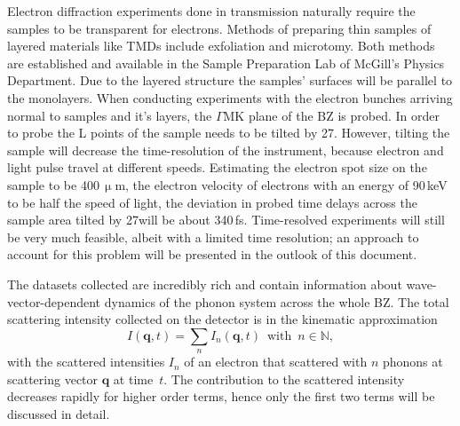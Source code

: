 Electron diffraction experiments done in transmission naturally require the samples to be transparent for electrons.
Methods of preparing thin samples of layered materials like \acp{TMD} include exfoliation\cite{exf} and microtomy\cite{micro}.
Both methods are established and available in the Sample Preparation Lab of McGill's Physics Department.
Due to the layered structure the samples' surfaces will be parallel to the monolayers.
When conducting experiments with the electron bunches arriving normal to \ts\space samples and it's layers, the $\Gamma\mathrm{MK}$ plane of the \ac{BZ} is probed.
In order to probe the L points of \ts\space the sample needs to be tilted by 27\textdegree.
However, tilting the sample will decrease the time-resolution of the instrument, because electron and light pulse travel at different speeds.
Estimating the electron spot size on the sample to be 400\,$\upmu$m, the electron velocity of electrons with an energy of 90\,keV to be half the speed of light, the deviation in probed time delays across the sample area tilted by 27\textdegree will be about 340\,fs.
Time-resolved experiments will still be very much feasible, albeit with a limited time resolution; an approach to account for this problem will be presented in the outlook of this document.

The datasets collected are incredibly rich and contain information about wave-vector-dependent dynamics of the phonon system across the whole \ac{BZ}.
The total scattering intensity collected on the detector is in the kinematic approximation
\begin{equation} I(\mathbf{q},t) = \sum_n I_n(\mathbf{q},t)\enspace\text{with}\enspace n \in\mathbb{N},\label{eq:I}\end{equation}
with the scattered intensities $I_n$ of an electron that scattered with $n$ phonons at scattering vector $\mathbf{q}$ at time~$t$.
The contribution to the scattered intensity decreases rapidly for higher order terms, hence only the first two terms will be discussed in detail.

